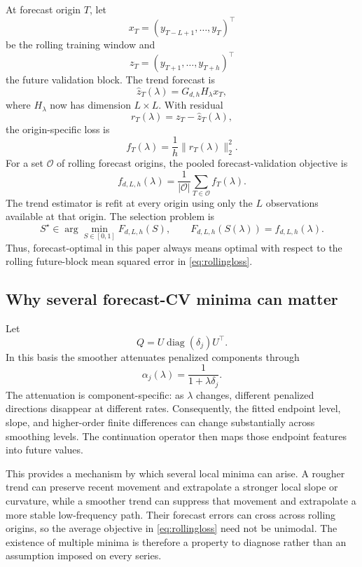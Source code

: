 \documentclass[english]{smcca}
\begin{document}
At forecast origin \(T\), let
\[
x_T=(y_{T-L+1},\ldots,y_T)^\top
\]
be the rolling training window and
\[
z_T=(y_{T+1},\ldots,y_{T+h})^\top
\]
the future validation block. The trend forecast is
\[
\widehat z_T(\lambda)
=
G_{d,h}H_\lambda x_T,
\]
where \(H_\lambda\) now has dimension \(L\times L\). With residual
\[
r_T(\lambda)=z_T-\widehat z_T(\lambda),
\]
the origin-specific loss is
\[
f_T(\lambda)
=
\frac{1}{h}\|r_T(\lambda)\|_2^2.
\]
For a set \(\mathcal{O}\) of rolling forecast origins, the pooled forecast-validation objective is
\begin{equation}
f_{d,L,h}(\lambda)
=
\frac{1}{|\mathcal{O}|}
\sum_{T\in\mathcal{O}}f_T(\lambda).
\label{eq:rollingloss}
\end{equation}
The trend estimator is refit at every origin using only the \(L\) observations available at that origin. The selection problem is
\begin{equation}
S^\star
\in
\arg\min_{S\in[0,1]}
F_{d,L,h}(S),
\qquad
F_{d,L,h}(S(\lambda))
=
f_{d,L,h}(\lambda).
\label{eq:selection}
\end{equation}
Thus, forecast-optimal in this paper always means optimal with respect to the rolling future-block mean squared error in \eqref{eq:rollingloss}.

\subsection{Why several forecast-CV minima can matter}

Let
\[
Q=U\operatorname{diag}(\delta_j)U^\top.
\]
In this basis the smoother attenuates penalized components through
\begin{equation}
\alpha_j(\lambda)
=
\frac{1}{1+\lambda\delta_j}.
\label{eq:spectralattenuation}
\end{equation}
The attenuation is component-specific: as \(\lambda\) changes, different
penalized directions disappear at different rates. Consequently, the fitted
endpoint level, slope, and higher-order finite differences can change
substantially across smoothing levels. The continuation operator then maps
those endpoint features into future values.

This provides a mechanism by which several local minima can arise. A rougher
trend can preserve recent movement and extrapolate a stronger local slope or
curvature, while a smoother trend can suppress that movement and extrapolate a
more stable low-frequency path. Their forecast errors can cross across rolling
origins, so the average objective in \eqref{eq:rollingloss} need not be unimodal.
The existence of multiple minima is therefore a property to diagnose rather
than an assumption imposed on every series.
\end{document}
